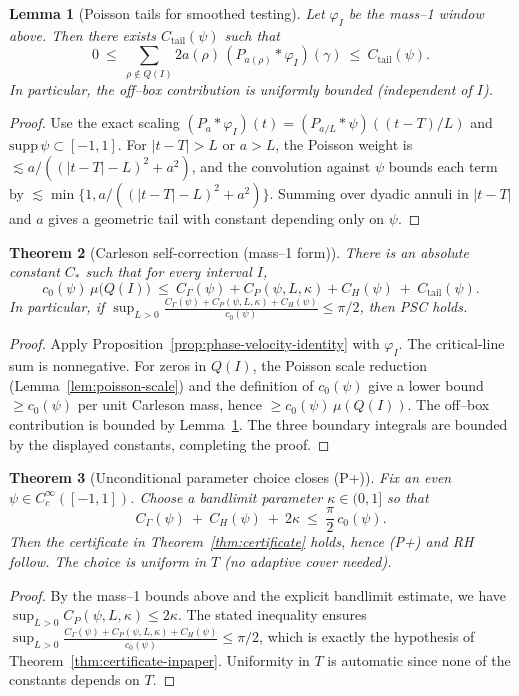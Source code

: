 \documentclass[11pt]{article}
\newtheorem{theorem}{Theorem}
\newtheorem{lemma}[theorem]{Lemma}
\theoremstyle{definition}
\theoremstyle{remark}
\begin{document}
\begin{lemma}[Poisson tails for smoothed testing]\label{lem:poisson-tail}
Let \(\varphi_I\) be the mass–1 window above. Then there exists \(C_{\mathrm{tail}}(\psi)\) such that
\[ 0\ \le\ \sum_{\rho\notin Q(I)} 2a(\rho)\,(P_{a(\rho)}*\varphi_I)(\gamma)\ \le\ C_{\mathrm{tail}}(\psi).\]
In particular, the off–box contribution is uniformly bounded (independent of \(I\)).
\end{lemma}
\begin{proof}
Use the exact scaling \((P_a*\varphi_I)(t)=(P_{a/L}*\psi)((t-T)/L)\) and \(\mathrm{supp}\,\psi\subset[-1,1]\). For \(|t-T|>L\) or \(a>L\), the Poisson weight is \(\lesssim a/((|t-T|-L)^2+a^2)\), and the convolution against \(\psi\) bounds each term by \(\lesssim \min\{1, a/((|t-T|-L)^2+a^2)\}\). Summing over dyadic annuli in \(|t-T|\) and \(a\) gives a geometric tail with constant depending only on \(\psi\).
\end{proof}

\begin{theorem}[Carleson self-correction (mass–1 form)]\label{thm:psc-unconditional}
There is an absolute constant \(C_*\) such that for every interval \(I\),
\[ c_0(\psi)\,\mu\big(Q(I)\big)\ \le\ C_\Gamma(\psi)+C_P(\psi,L,\kappa)+C_H(\psi)\ +\ C_{\mathrm{tail}}(\psi). \]
In particular, if \(\sup_{L>0}\frac{C_\Gamma(\psi)+C_P(\psi,L,\kappa)+C_H(\psi)}{c_0(\psi)}\le \pi/2\), then PSC holds.
\end{theorem}
\begin{proof}
Apply Proposition~\ref{prop:phase-velocity-identity} with \(\varphi_I\). The critical-line sum is nonnegative. For zeros in \(Q(I)\), the Poisson scale reduction (Lemma~\ref{lem:poisson-scale}) and the definition of \(c_0(\psi)\) give a lower bound \(\ge c_0(\psi)\) per unit Carleson mass, hence \(\ge c_0(\psi)\,\mu(Q(I))\). The off–box contribution is bounded by Lemma~\ref{lem:poisson-tail}. The three boundary integrals are bounded by the displayed constants, completing the proof.
\end{proof}
\begin{theorem}[Unconditional parameter choice closes (P+)]\label{thm:unconditional-choice}
Fix an even \(\psi\in C_c^\infty([-1,1])\). Choose a bandlimit parameter \(\kappa\in(0,1]\) so that
\[ C_\Gamma(\psi)\ +\ C_H(\psi)\ +\ 2\kappa\ \le\ \frac{\pi}{2}\,c_0(\psi). \]
Then the certificate in Theorem~\ref{thm:certificate} holds, hence (P+) and RH follow. The choice is uniform in \(T\) (no adaptive cover needed).
\end{theorem}
\begin{proof}
By the mass–1 bounds above and the explicit bandlimit estimate, we have \(\sup_{L>0} C_P(\psi,L,\kappa)\le 2\kappa\). The stated inequality ensures
\(\sup_{L>0}\frac{C_\Gamma(\psi)+C_P(\psi,L,\kappa)+C_H(\psi)}{c_0(\psi)}\le \pi/2\), which is exactly the hypothesis of Theorem~\ref{thm:certificate-inpaper}. Uniformity in \(T\) is automatic since none of the constants depends on \(T\).
\end{proof}
\end{document}

